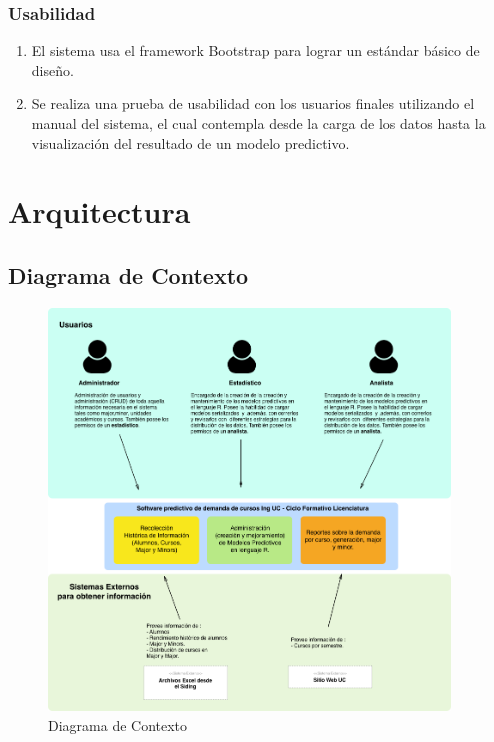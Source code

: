 \subsubsection{Usabilidad \label{sec:usability}}
	\begin{enumerate}
		\item El sistema usa el framework Bootstrap para lograr un estándar básico de diseño.
		\item Se realiza una prueba de usabilidad con los usuarios finales utilizando el manual del sistema, el cual contempla desde la carga de los datos hasta la visualización del resultado de un modelo predictivo.
	\end{enumerate}

\section{Arquitectura \label{sec:architecture}}
\subsection{Diagrama de Contexto \label{sec:context_diagram}}

	\begin{figure}[H]
		\begin{center}
		  \includegraphics[width=0.95\textwidth]{./figures/chapter_03/02_diagrama_de_contexto.png}
		  \caption{Diagrama de Contexto}
		  \label{fig:context_diagram_picture}
		\end{center}
	\end{figure}


